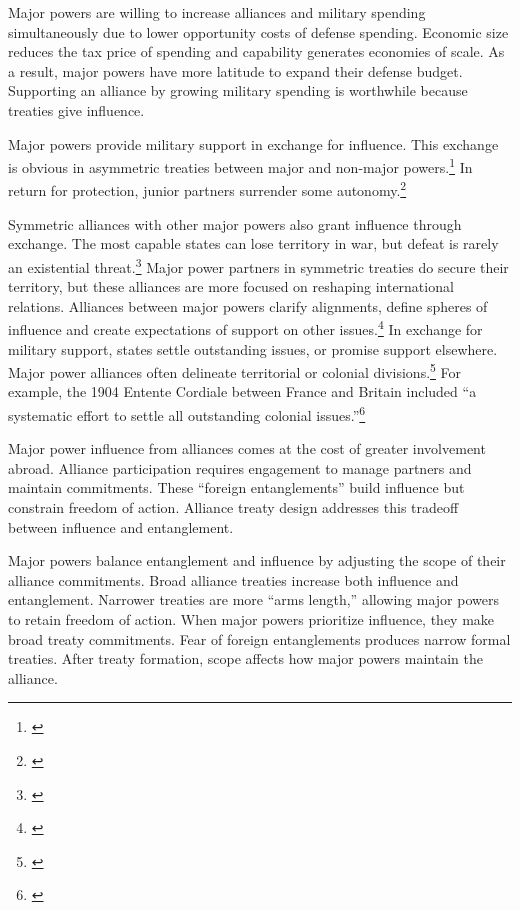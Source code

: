 \documentclass[12pt]{article}
\begin{document}
Major powers are willing to increase alliances and military spending simultaneously due to lower opportunity costs of defense spending. 
Economic size reduces the tax price of spending and capability generates economies of scale. 
As a result, major powers have more latitude to expand their defense budget.  
Supporting an alliance by growing military spending is worthwhile because treaties give influence. 


Major powers provide military support in exchange for influence. 
This exchange is obvious in asymmetric treaties between major and non-major powers.\footnote{\citep{Morrow1991}}
In return for protection, junior partners surrender some autonomy.\footnote{\citep{Lake2009}}


Symmetric alliances with other major powers also grant influence through exchange.
The most capable states can lose territory in war, but defeat is rarely an existential threat.\footnote{\citep{Fazal2011}} 
Major power partners in symmetric treaties do secure their territory, but these alliances are more focused on reshaping international relations. 
Alliances between major powers clarify alignments, define spheres of influence and create expectations of support on other issues.\footnote{\citep{Snyder1997}} 
In exchange for military support, states settle outstanding issues, or promise support elsewhere. 
Major power alliances often delineate territorial or colonial divisions.\footnote{\citep{Langer1950, Kissinger1994}}
For example, the 1904 Entente Cordiale between France and Britain included ``a systematic effort to settle all outstanding colonial issues.''\footnote{\citep[pg. 189]{Kissinger1994}}


Major power influence from alliances comes at the cost of greater involvement abroad.
Alliance participation requires engagement to manage partners and maintain commitments.
These ``foreign entanglements'' build influence but constrain freedom of action.
Alliance treaty design addresses this tradeoff between influence and entanglement. 


Major powers balance entanglement and influence by adjusting the scope of their alliance commitments. 
Broad alliance treaties increase both influence and entanglement. 
Narrower treaties are more ``arms length,'' allowing major powers to retain freedom of action. 
When major powers prioritize influence, they make broad treaty commitments.
Fear of foreign entanglements produces narrow formal treaties. 
After treaty formation, scope affects how major powers maintain the alliance. 
\end{document}
